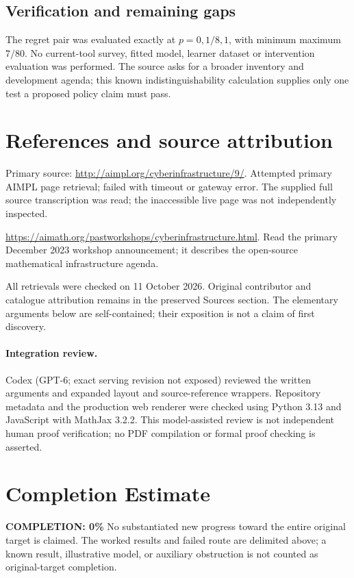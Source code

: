 \documentclass[11pt]{article}
\begin{document}
\subsection{Verification and remaining gaps}
The regret pair was evaluated exactly at $p=0,1/8,1$, with minimum maximum $7/80$. No current-tool survey, fitted model, learner dataset or intervention evaluation was performed. The source asks for a broader inventory and development agenda; this known indistinguishability calculation supplies only one test a proposed policy claim must pass.

\section{References and source attribution}
Primary source: \url{http://aimpl.org/cyberinfrastructure/9/}. Attempted primary AIMPL page retrieval; failed with timeout or gateway error. The supplied full source transcription was read; the inaccessible live page was not independently inspected.

\url{https://aimath.org/pastworkshops/cyberinfrastructure.html}. Read the primary December 2023 workshop announcement; it describes the open-source mathematical infrastructure agenda.

All retrievals were checked on 11 October 2026. Original contributor and catalogue attribution remains in the preserved Sources section. The elementary arguments below are self-contained; their exposition is not a claim of first discovery.


\paragraph{Integration review.} Codex (GPT-6; exact serving revision not exposed) reviewed the written arguments and expanded layout and source-reference wrappers. Repository metadata and the production web renderer were checked using Python 3.13 and JavaScript with MathJax 3.2.2. This model-assisted review is not independent human proof verification; no PDF compilation or formal proof checking is asserted.

\section{Completion Estimate}
\noindent\textbf{COMPLETION: 0\%}
No substantiated new progress toward the entire original target is claimed. The worked results and failed route are delimited above; a known result, illustrative model, or auxiliary obstruction is not counted as original-target completion.
\end{document}
